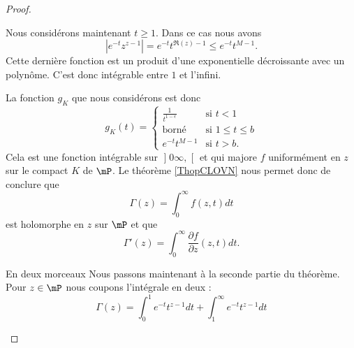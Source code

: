 \begin{proof}
\begin{subproof}
            Nous considérons maintenant \( t\geq 1\). Dans ce cas nous avons
            \begin{equation}
                |  e^{-t}z^{z-1} |= e^{-t}t^{\Re(z)-1}\leq  e^{-t}t^{M-1}.
            \end{equation}
            Cette dernière fonction est un produit d'une exponentielle décroissante avec un polynôme. C'est donc intégrable entre \( 1\) et l'infini.

            La fonction \( g_K\) que nous considérons est donc
            \begin{equation}
                g_K(t)=\begin{cases}
                    \frac{1}{ t^{1-\epsilon} }    &   \text{si } t<1\\
                    \text{borné}    &    \text{si } 1\leq t\leq b\\
                    e^{-t}t^{M-1}    &    \text{si } t>b.
                \end{cases}
            \end{equation}
            Cela est une fonction intégrable sur \( \mathopen] 0    \infty ,  \mathclose[\) et qui majore \( f\) uniformément en \( z\) sur le compact \( K\) de \( \mP\). Le théorème \ref{ThopCLOVN} nous permet donc de conclure que
            \begin{equation}
                \Gamma(z)=\int_0^{\infty}f(z,t)dt
            \end{equation}
            est holomorphe en \( z\) sur \( \mP\) et que
            \begin{equation}
                \Gamma'(z)=\int_0^{\infty}\frac{ \partial f }{ \partial z }(z,t)dt.
            \end{equation}
            
        \item[En deux morceaux] Nous passons maintenant à la seconde partie du théorème. Pour \( z\in \mP\) nous coupons l'intégrale en deux :
            \begin{equation}
                \Gamma(z)=\int_0^1 e^{-t}t^{z-1}dt+\int_1^{\infty} e^{-t}t^{z-1}dt
            \end{equation}
            

\end{subproof}
\end{proof}

